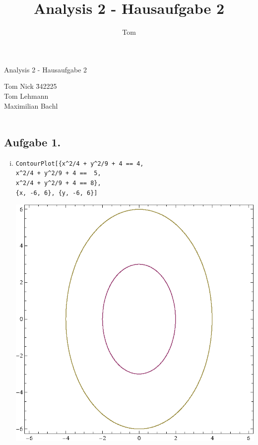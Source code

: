 \documentclass[10pt,a4paper]{scrartcl}
\author{Tom}
\title{Analysis 2 - Hausaufgabe 2}
\begin{document}
\begin{center}
\Large{Analysis 2 - Hausaufgabe 2} \\
\end{center}
\begin{tabbing}
Tom Nick \hspace{1.4cm}\= 342225\\
Tom Lehmann\\
Maximilian Bachl\\\\ 
\end{tabbing}
\subsection*{Aufgabe 1.}
\begin{enumerate}[(i)]
\item 
\begin{minipage}{0.49\columnwidth}
\begin{lstlisting}
ContourPlot[{x^2/4 + y^2/9 + 4 == 4, 
x^2/4 + y^2/9 + 4 ==  5, 
x^2/4 + y^2/9 + 4 == 8}, 
{x, -6, 6}, {y, -6, 6}]
\end{lstlisting}
\end{minipage}
\begin{minipage}{0.50\columnwidth}
\includegraphics[scale=0.7]{1i.eps} 
\end{minipage}

\end{enumerate}
\end{document}
